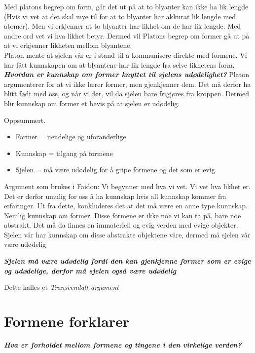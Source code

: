\documentclass[11pt, a4paper]{article}
\begin{document}
Med platons begrep om form, går det ut på at to blyanter kan ikke ha lik lengde (Hvis vi vet at det skal mye til for at to blyanter har akkurat lik lengde med atomer). Men vi erkjenner at to blyanter har likhet om de har lik lengde. Med andre ord vet vi hva likhet betyr. Dermed vil Platons begrep om former gå ut på at vi erkjenner likheten mellom blyantene.\\

Platon mente at sjelen vår er i stand til å kommunisere direkte med formene. Vi har fått kunnskapen om at blyantene har lik lengde fra selve likhetens form.\\


\textbf{\textit{Hvordan er kunnskap om former knyttet til sjelens udødelighet?}}
Platon argumenterer for at vi ikke lærer former, men gjenkjenner dem. Det må derfor ha blitt født med oss, og når vi dør, vil da sjelen bare frigjøres fra kroppen. Dermed blir kunnskap om former et bevis på at sjelen er udødelig.

Oppsummert. 

\begin{itemize}
    \item Former = uendelige og uforanderlige
    \item Kunnskap = tilgang på formene
    \item Sjelen = må være udødelig for å gripe formene og det som er evig.
\end{itemize}



Argument som brukes i Faidon:
Vi begynner med hva vi vet. Vi vet hva likhet er. Det er derfor umulig for oss å ha kunnskap hvis all kunnskap kommer fra erfaringer. Ut fra dette, konkluderes det at det må være en anne type kunnskap. Nemlig kunnskap om former. Disse formene er ikke noe vi kan ta på, bare noe abstrakt. Det må da finnes en immateriell og evig verden med evige objekter. Sjelen vår har kunnskap om disse abstrakte objektene våre, dermed må sjelen vår være udødelig

\textbf{\textit{Sjelen må være udødelig fordi den kan gjenkjenne former som er evige og udødelige, derfor må sjelen også være udødelig}}

Dette kalles et \textit{Transcendalt argument}


\section{Formene forklarer}


\textbf{\textit{Hva er forholdet mellom formene og tingene i den virkelige verden?}}
\end{document}
